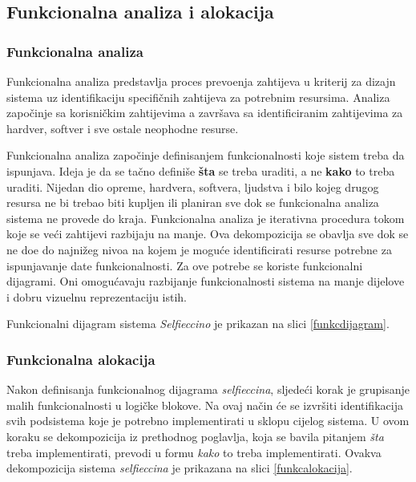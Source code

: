 \documentclass[12pt]{article}
\begin{document}
\clearpage


\subsection{Funkcionalna analiza i alokacija}
\subsubsection{Funkcionalna analiza}
Funkcionalna analiza predstavlja proces prevo\dj enja zahtijeva u kriterij za dizajn sistema uz identifikaciju specifi\v{c}nih zahtijeva za potrebnim resursima. Analiza zapo\v{c}inje sa korisni\v{c}kim zahtijevima a zavr\v{s}ava sa identificiranim zahtijevima za hardver, softver i sve ostale neophodne resurse.

Funkcionalna analiza zapo\v{c}inje definisanjem funkcionalnosti koje sistem treba da ispunjava. Ideja je da se ta\v{c}no defini\v{s}e \textbf{\v{s}ta} se treba uraditi, a ne \textbf{kako} to treba uraditi. Nijedan dio opreme, hardvera, softvera, ljudstva i bilo kojeg drugog resursa ne bi trebao biti kupljen ili planiran sve dok se funkcionalna analiza sistema ne provede do kraja. Funkcionalna analiza je iterativna procedura tokom koje se ve\'ci zahtijevi razbijaju na manje. Ova dekompozicija se obavlja sve dok se ne do\dj e do najni\v{z}eg nivoa na kojem je mogu\'ce identificirati resurse potrebne za ispunjavanje date funkcionalnosti. Za ove potrebe se koriste funkcionalni dijagrami. Oni omogu\'cavaju razbijanje funkcionalnosti sistema na manje dijelove i dobru vizuelnu reprezentaciju istih. 

Funkcionalni dijagram sistema \textit{Selfieccino} je prikazan na slici \ref{funkcdijagram}. 

\subsubsection{Funkcionalna alokacija}
Nakon definisanja funkcionalnog dijagrama \textit{selfieccina}, sljede\'ci korak je grupisanje malih funkcionalnosti u logi\v{c}ke blokove. Na ovaj na\v{c}in \'ce se izvr\v{s}iti identifikacija svih podsistema koje je potrebno implementirati u sklopu cijelog sistema. U ovom koraku se dekompozicija iz prethodnog poglavlja, koja se bavila pitanjem \textit{\v{s}ta} treba implementirati, prevodi u formu \textit{kako} to treba implementirati. Ovakva dekompozicija sistema \textit{selfieccina} je prikazana na slici \ref{funkcalokacija}.

\newpage
\end{document}
